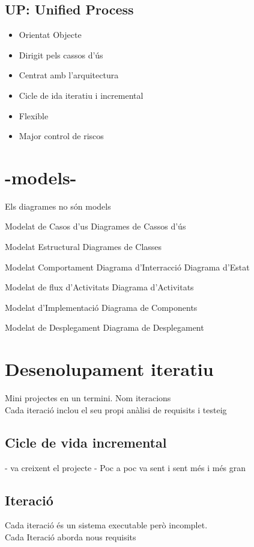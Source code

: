 \documentclass{article}
\begin{document}
\subsection{UP: Unified Process}
\begin{itemize}
\item Orientat Objecte
\item Dirigit pels cassos d'ús
\item Centrat amb l'arquitectura
\item Cicle de ida iteratiu i incremental
\item Flexible
\item Major control de riscos
\end{itemize}

\section{-models-}
Els diagrames no són models
\begin{itemize}
\item Modelat de Casos d'us
	\subitem Diagrames de Cassos d'ús
\item Modelat Estructural
	\subitem Diagrames de Classes
\item Modelat Comportament
	\subitem Diagrama d'Interracció
	\subitem Diagrama d'Estat
{\color{blue}
\item Modelat de flux d'Activitats
	\subitem Diagrama d'Activitats
\item Modelat d'Implementació
	\subitem Diagrama de Components
\item Modelat de Desplegament
	\subitem Diagrama de Desplegament
}
\end{itemize}

\section{Desenolupament iteratiu}
Mini projectes en un termini. Nom iteracions\\
Cada iteració inclou el seu propi anàlisi de requisits i testeig
\subsection{Cicle de vida incremental}
- va creixent el projecte - Poc a poc va sent i sent més i més gran
\subsection{Iteració}
Cada iteració és un sistema executable però incomplet.\\
Cada Iteració aborda nous requisits
\end{document}
